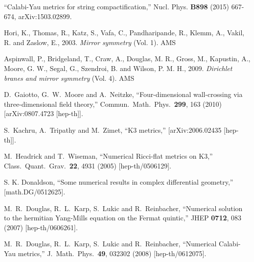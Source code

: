 \documentclass[12pt]{article}
\def\bx{\bar{x}}
\begin{document}
{{{{\def\bx{\bf}
\def\etal{{\it et.~al.}}
\def\NP#1{Nucl. Phys. {\bx #1}}
\def\NPPS#1{Nucl. Phys. (Proc. Suppl.) {\bx #1}}
\def\PL#1{Phys. Lett. {\bx #1}}
\def\PR#1{Phys. Rev. {\bx #1}}
\def\PRL#1{Phys. Rev. Lett. {\bx #1}}
\def\ANN#1{Annals Phys. {\bx #1}}
\def\IJMP#1{Int. J. Mod. Phys. {\bx #1}}
\def\JH#1{J. High Energy Phys. {\bx #1}}
\def\JMP#1{J. Math. Phys. {\bx #1}}
\def\RMP#1{Rev. Mod. Phys. {\bx #1}}
\def\CMP#1{Comm. Math. Phys. {\bx #1}}
\def\ATMP#1{Adv. Theor. Math. Phys {\bx #1}}
\def\ep#1{{#1}}


\begin{thebibliography}{10}

``Calabi-Yau metrics for string compactification,''
\NP{B898} (2015) 667-674,
\ep{ arXiv:1503.02899}.

Hori, K., Thomas, R., Katz, S., Vafa, C., Pandharipande, R., Klemm, A., Vakil, R. and Zaslow, E., 2003. 
{\it Mirror symmetry} (Vol. 1). AMS

Aspinwall, P., Bridgeland, T., Craw, A., Douglas, M. R., 
Gross, M., Kapustin, A., Moore, G. W., Segal, G.,
Szendroi, B. and Wilson, P. M. H., 2009. {\it Dirichlet branes and mirror symmetry} (Vol. 4). AMS
  
  D.~Gaiotto, G.~W.~Moore and A.~Neitzke,
  ``Four-dimensional wall-crossing via three-dimensional field theory,''
  Commun.\ Math.\ Phys.\  {\bf 299}, 163 (2010)
 [arXiv:0807.4723 [hep-th]].

S.~Kachru, A.~Tripathy and M.~Zimet,
``K3 metrics,''
[arXiv:2006.02435 [hep-th]].

  M.~Headrick and T.~Wiseman,
  ``Numerical Ricci-flat metrics on K3,''
  Class.\ Quant.\ Grav.\  {\bf 22}, 4931 (2005)
  [hep-th/0506129].

S. K. Donaldson, 
``Some numerical results in complex differential geometry,'' [math.DG/0512625].


  M.~R.~Douglas, R.~L.~Karp, S.~Lukic and R.~Reinbacher,
  ``Numerical solution to the hermitian Yang-Mills equation on the Fermat quintic,''
  JHEP {\bf 0712}, 083 (2007)
  [hep-th/0606261].

  M.~R.~Douglas, R.~L.~Karp, S.~Lukic and R.~Reinbacher,
  ``Numerical Calabi-Yau metrics,''
  J.\ Math.\ Phys.\  {\bf 49}, 032302 (2008)
  [hep-th/0612075].


\end{thebibliography}}}}}
\end{document}
